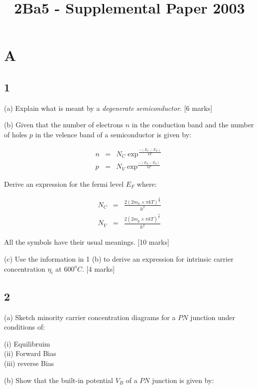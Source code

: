 \documentclass[a4paper,12pt]{article}
\begin{document}
\title{2Ba5 - Supplemental Paper 2003}

\maketitle

\section*{A}

\subsection{1}

(a) Explain what is meant by a \emph{degenerate semiconductor}. [6 marks]


(b) Given that the number of electrons $n$ in the conduction band and the
number of holes $p$ in the velence band of a semiconductor is given by:

\begin{eqnarray*}
n & = & N_{C}\exp^{\frac{-(E_{C} - E_{F})}{kT}} \\
p & = & N_{V}\exp^{\frac{-(E_{F} - E_{V})}{kT}}
\end{eqnarray*}

Derive an expression for the fermi level $E_{F}$ where:

\begin{eqnarray*}
N_{C} & = & \frac{2(2m_{n} \times \pi kT)^{\frac{3}{2}}}{h^{2}} \\
N_{V} & = & \frac{2(2m_{p} \times \pi kT)^{\frac{3}{2}}}{h^{2}}
\end{eqnarray*}

All the symbols have their usual meanings. [10 marks]


(c) Use the information in 1 (b) to derive an expression for intrinsic
carrier concentration $\eta_{i}$ at $600^{o} C$. [4 marks]

\subsection*{2}

(a) Sketch minority carrier concentration diagrams for a $PN$ junction under
conditions of:

(i) Equilibruim \\
(ii) Forward Bias \\
(iii) reverse Bias


(b) Show that the built-in potential $V_{B}$ of a $PN$ junction is given by:
\end{document}
